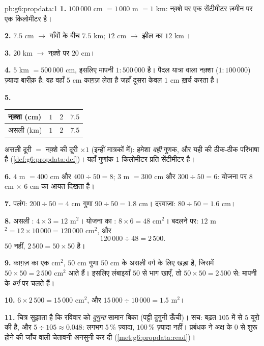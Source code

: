 \begin{solution}{pb:g6:propdata:1}
\textbf{1.} $100\,000$ cm $= 1\,000$ m $= 1$ km: नक़्शे पर एक
सेंटीमीटर ज़मीन पर एक किलोमीटर है।

\textbf{2.} $7.5$ cm $\rightarrow$ गाँवों के बीच $7.5$ km;
$12$ cm $\rightarrow$ झील का $12$ km ।

\textbf{3.} $20$ km $\rightarrow$ नक़्शे पर $20$ cm।

\textbf{4.} $5$ km $= 500\,000$ cm, इसलिए मापनी
$1:500\,000$ है। पैदल यात्रा वाला नक़्शा ($1:100\,000$) ज़्यादा
बारीक़ है: वह वहाँ $5$ cm काग़ज़ लेता है जहाँ दूसरा केवल
$1$ cm ख़र्च करता है।

\textbf{5.}
\begin{center}
\renewcommand{\arraystretch}{1.2}
\begin{tabular}{l|ccc}
नक़्शा (cm) & $1$ & $2$ & $7.5$ \\
\hline
असली (km) & $1$ & $2$ & $7.5$ \\
\end{tabular}
\end{center}
असली दूरी $=$ नक़्शे की दूरी $\times 1$ (इन्हीं मात्रकों में):
हमेशा \emph{वही} गुणक, और यही  की ठीक-ठीक परिभाषा है
(\cref{def:g6:propdata:def})। यहाँ गुणांक $1$
किलोमीटर प्रति सेंटीमीटर है।

\textbf{6.} $4$ m $= 400$ cm और $400 \div 50 = 8$;
$3$ m $= 300$ cm और $300 \div 50 = 6$: योजना पर
$8$ cm $\times$ $6$ cm का आयत दिखता है।

\textbf{7.} पलंग: $200 \div 50 = 4$ cm गुणा $90 \div 50 = 1.8$ cm।
दरवाज़ा: $80 \div 50 = 1.6$ cm।

\textbf{8.} असली : $4 \times 3 = 12$ m$^2$। योजना का
: $8 \times 6 = 48$ cm$^2$। बदलने पर:
$12$ m$^2 = 12 \times 10\,000 = 120\,000$ cm$^2$, और
\[
120\,000 \div 48 = 2\,500 .
\]
 $50$ नहीं, $2\,500 = 50 \times 50$ है।

\textbf{9.} काग़ज़ का एक cm$^2$, $50$ cm गुणा $50$ cm के असली
वर्ग के लिए खड़ा है, जिसमें
$50 \times 50 = 2\,500$ cm$^2$ आते हैं। इसलिए लंबाइयाँ $50$ से
भाग खाएँ, तो  $50 \times 50 = 2\,500$ से: 
मापनी के \emph{वर्ग} पर चलते हैं।

\textbf{10.} $6 \times 2\,500 = 15\,000$ cm$^2$, और
$15\,000 \div 10\,000 = 1.5$ m$^2$।

\textbf{11.} चित्र सुझाता है कि रविवार को \emph{दुगुना} सामान
बिका (पट्टी दुगुनी ऊँची)। सच: बढ़त $105$ में से $5$ यूरो की है,
और $5 \div 105 \approx 0.048$: लगभग $5\,\%$ ज़्यादा,
$100\,\%$ ज़्यादा नहीं। प्रबंधक ने अक्ष के $0$ से शुरू होने की
जाँच वाली चेतावनी अनसुनी कर दी
(\cref{met:g6:propdata:read})।


\end{solution}
